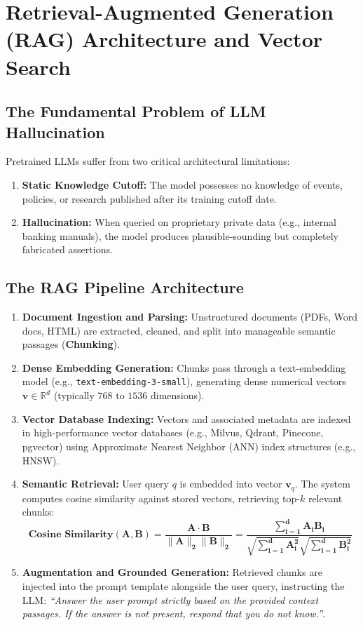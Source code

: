 \section{Retrieval-Augmented Generation (RAG) Architecture and Vector Search}
\label{sec:rag_architecture}

\subsection{The Fundamental Problem of LLM Hallucination}
Pretrained LLMs suffer from two critical architectural limitations:
\begin{enumerate}
    \item \textbf{Static Knowledge Cutoff:} The model possesses no knowledge of events, policies, or research published after its training cutoff date.
    \item \textbf{Hallucination:} When queried on proprietary private data (e.g., internal banking manuals), the model produces plausible-sounding but completely fabricated assertions.
\end{enumerate}

\subsection{The RAG Pipeline Architecture}
\begin{enumerate}
    \item \textbf{Document Ingestion and Parsing:} Unstructured documents (PDFs, Word docs, HTML) are extracted, cleaned, and split into manageable semantic passages (\textbf{Chunking}).
    \item \textbf{Dense Embedding Generation:} Chunks pass through a text-embedding model (e.g., \texttt{text-embedding-3-small}), generating dense numerical vectors $\mathbf{v} \in \mathbb{R}^d$ (typically $768$ to $1536$ dimensions).
    \item \textbf{Vector Database Indexing:} Vectors and associated metadata are indexed in high-performance vector databases (e.g., Milvus, Qdrant, Pinecone, pgvector) using Approximate Nearest Neighbor (ANN) index structures (e.g., HNSW).
    \item \textbf{Semantic Retrieval:} User query $q$ is embedded into vector $\mathbf{v}_q$. The system computes cosine similarity against stored vectors, retrieving top-$k$ relevant chunks:
    \begin{equation}
    \label{eq:cosine_similarity}
    \mathbf{\text{Cosine Similarity}(\mathbf{A}, \mathbf{B}) = \frac{\mathbf{A} \cdot \mathbf{B}}{\|\mathbf{A}\|_2 \|\mathbf{B}\|_2} = \frac{\sum_{i=1}^d A_i B_i}{\sqrt{\sum_{i=1}^d A_i^2} \sqrt{\sum_{i=1}^d B_i^2}}}
    \end{equation}
    \item \textbf{Augmentation and Grounded Generation:} Retrieved chunks are injected into the prompt template alongside the user query, instructing the LLM: \textit{``Answer the user prompt strictly based on the provided context passages. If the answer is not present, respond that you do not know.''}.
\end{enumerate}


